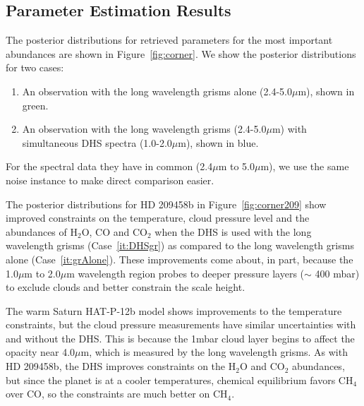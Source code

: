 \documentclass[iop]{emulateapj}
\begin{document}
\subsection{Parameter Estimation Results}\label{sec:retrievals}

The posterior distributions for retrieved parameters for the most important abundances are shown in Figure~\ref{fig:corner}.
We show the posterior distributions for two cases:
\begin{enumerate}
\item \label{it:DHSgr} An observation with the long wavelength grisms alone (2.4-5.0$\mu$m), shown in green.
\item \label{it:grAlone} An observation with the long wavelength grisms (2.4-5.0$\mu$m) with simultaneous DHS spectra (1.0-2.0$\mu$m), shown in blue.
\end{enumerate}
For the spectral data they have in common (2.4$\mu$m to 5.0$\mu$m), we use the same noise instance to make direct comparison easier.

The posterior distributions for HD 209458b in Figure~\ref{fig:corner209} show improved constraints on the temperature, cloud pressure level and the abundances of H$_2$O, CO and CO$_2$ when the DHS is used with the long wavelength grisms (Case~\ref{it:DHSgr}) as compared to the long wavelength grisms alone (Case~\ref{it:grAlone}).
These improvements come about, in part, because the 1.0$\mu$m to 2.0$\mu$m wavelength region probes to deeper pressure layers ($\sim$ 400 mbar) to exclude clouds and better constrain the scale height.




The warm Saturn HAT-P-12b model shows improvements to the temperature constraints, but the cloud pressure measurements have similar uncertainties with and without the DHS.
This is because the 1mbar cloud layer begins to affect the opacity near 4.0$\mu$m, which is measured by the long wavelength grisms.
As with HD 209458b, the DHS improves constraints on the H$_2$O and CO$_2$ abundances, but since the planet is at a cooler temperatures, chemical equilibrium favors CH$_4$ over CO, so the constraints are much better on CH$_4$.
\end{document}
